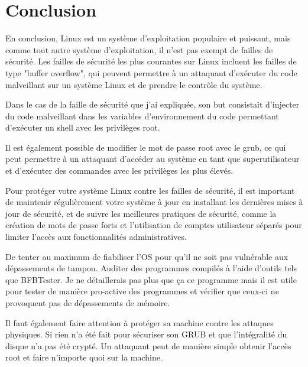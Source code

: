 \documentclass[12pt,a4paper]{article}
\begin{document}
        \newpage
        \section{Conclusion}
        \begin{flushleft}
            \noindent En conclusion, Linux est un système d'exploitation populaire et puissant, mais comme tout autre système d'exploitation, il n'est pas exempt de failles de sécurité. Les failles de sécurité les plus courantes sur Linux incluent les failles de type "buffer overflow", qui peuvent permettre à un attaquant d'exécuter du code malveillant sur un système Linux et de prendre le contrôle du système.
            \item Dans le cas de la faille de sécurité que j'ai expliquée, son but consistait d'injecter du code malveillant dans les variables d'environnement du code permettant d'exécuter un shell avec les privilèges root.
            \item Il est également possible de modifier le mot de passe root avec le grub, ce qui peut permettre à un attaquant d'accéder au système en tant que superutilisateur et d'exécuter des commandes avec les privilèges les plus élevés. 
            \item Pour protéger votre système Linux contre les failles de sécurité, il est important de maintenir régulièrement votre système à jour en installant les dernières mises à jour de sécurité, et de suivre les meilleures pratiques de sécurité, comme la création de mots de passe forts et l'utilisation de comptes utilisateur séparés pour limiter l'accès aux fonctionnalités administratives.
            \item De tenter au maximum de fiabiliser l'OS pour qu'il ne soit pas vulnérable aux dépassements de tampon. Auditer des programmes compilés à l'aide d'outils tels que BFBTester. Je ne détaillerais pas plus que ça ce programme mais il est utile pour tester de manière pro-active des programmes et vérifier que ceux-ci ne provoquent pas de dépassements de mémoire.
            \item Il faut également faire attention à protéger sa machine contre les attaques physiques. Si rien n'a été fait pour sécuriser son GRUB et que l'intégralité du disque n'a pas été crypté. Un attaquant peut de manière simple obtenir l'accès root et faire n'importe quoi sur la machine.
        \end{flushleft}

        \newpage
        \nocite{*}
	
	
\end{document}
